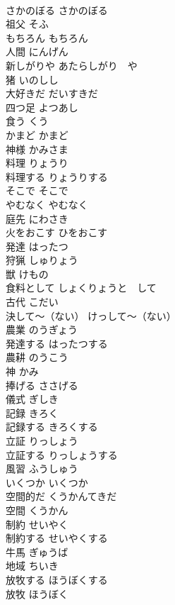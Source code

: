 \documentclass[8pt]{extreport}
\begin{document}
\begin{CJK}{UTF8}{min}
\\	さかのぼる	さかのぼる	
\\	祖父	そふ	
\\	もちろん	もちろん	
\\	人間	にんげん	
\\	新しがりや	あたらしがり　や	
\\	猪	いのしし	
\\	大好きだ	だいすきだ	
\\	四つ足	よつあし	
\\	食う	くう	
\\	かまど	かまど	
\\	神様	かみさま	
\\	料理	りょうり	
\\	料理する	りょうりする	
\\	そこで	そこで	
\\	やむなく	やむなく	
\\	庭先	にわさき	
\\	火をおこす	ひをおこす	
\\	発達	はったつ	
\\	狩猟	しゅりょう	
\\	獣	けもの	
\\	食料として	しょくりょうと　して	
\\	古代	こだい	
\\	決して〜（ない）	けっして〜（ない）	
\\	農業	のうぎょう	
\\	発達する	はったつする	
\\	農耕	のうこう	
\\	神	かみ	
\\	捧げる	ささげる	
\\	儀式	ぎしき	
\\	記録	きろく	
\\	記録する	きろくする	
\\	立証	りっしょう	
\\	立証する	りっしょうする	
\\	風習	ふうしゅう	
\\	いくつか	いくつか	
\\	空間的だ	くうかんてきだ	
\\	空間	くうかん	
\\	制約	せいやく	
\\	制約する	せいやくする	
\\	牛馬	ぎゅうば	
\\	地域	ちいき	
\\	放牧する	ほうぼくする	
\\	放牧	ほうぼく	

\end{CJK}
\end{document}
